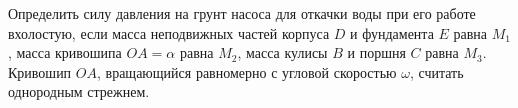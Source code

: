 Определить силу давления на грунт насоса для откачки воды при его работе
вхолостую, если масса неподвижных частей корпуса $D$ и фундамента $E$
равна $M_{1}$, масса кривошипа $OA=\alpha$ равна $M_{2}$, масса кулисы $B$
и поршня $C$ равна $M_{3}$. Кривошип $OA$, вращающийся равномерно с угловой
скоростью $\omega$, считать однородным стрежнем.
